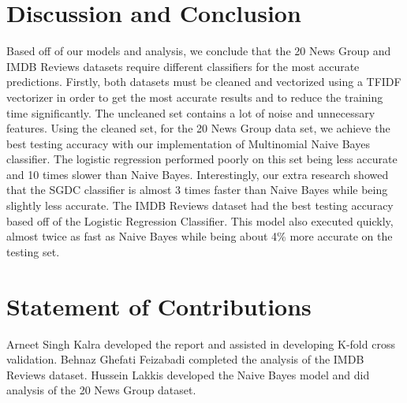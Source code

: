 \documentclass{homework}
\begin{document}
\section{Discussion and Conclusion}
Based off of our models and analysis, we conclude that the 20 News Group and IMDB Reviews datasets require different classifiers for the most accurate predictions. Firstly, both datasets must be cleaned and vectorized using a TFIDF vectorizer in order to get the most accurate results and to reduce the training time significantly. The uncleaned set contains a lot of noise and unnecessary features. Using the cleaned set, for the 20 News Group data set, we achieve the best testing accuracy with our implementation of Multinomial Naive Bayes classifier. The logistic regression performed poorly on this set being less accurate and 10 times slower than Naive Bayes. Interestingly, our extra research showed that the SGDC classifier is almost 3 times faster than Naive Bayes while being slightly less accurate. The IMDB Reviews dataset had the best testing accuracy based off of the Logistic Regression Classifier. This model also executed quickly, almost twice as fast as Naive Bayes while being about 4\% more accurate on the testing set.

\section{Statement of Contributions}
Arneet Singh Kalra developed the report and assisted in developing K-fold cross validation. Behnaz Ghefati Feizabadi completed the analysis of the IMDB Reviews dataset. Hussein Lakkis developed the Naive Bayes model and did analysis of the 20 News Group dataset. 

\printbibliography
\end{document}
